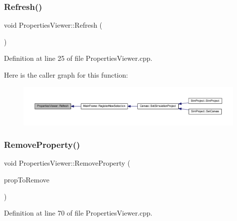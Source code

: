 \subsubsection{\texorpdfstring{Refresh()}{Refresh()}}
{\footnotesize\ttfamily void Properties\+Viewer\+::\+Refresh (\begin{DoxyParamCaption}{ }\end{DoxyParamCaption})}



Definition at line 25 of file Properties\+Viewer.\+cpp.

Here is the caller graph for this function\+:
\nopagebreak
\begin{figure}[H]
\begin{center}
\leavevmode
\includegraphics[width=350pt]{class_properties_viewer_aac1a5924495246147e465375a686d938_icgraph}
\end{center}
\end{figure}
\mbox{\label{class_properties_viewer_a17827ffbcf53b5dc5cd2d0873d2bf2e7}} 
\subsubsection{\texorpdfstring{Remove\+Property()}{RemoveProperty()}}
{\footnotesize\ttfamily void Properties\+Viewer\+::\+Remove\+Property (\begin{DoxyParamCaption}\item[{wx\+P\+G\+Property $\ast$}]{prop\+To\+Remove }\end{DoxyParamCaption})}



Definition at line 70 of file Properties\+Viewer.\+cpp.

